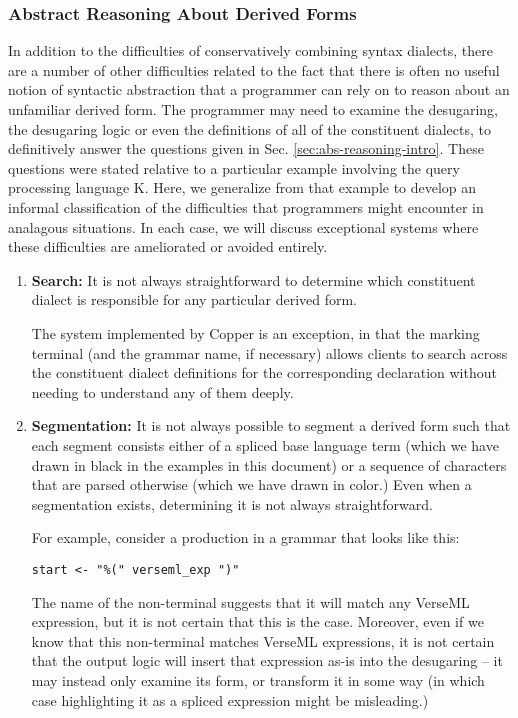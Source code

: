 {\subsubsection{Abstract Reasoning About Derived Forms}
In addition to the difficulties of conservatively combining syntax dialects, there are a  number of other difficulties related to the fact that there is often no useful notion of syntactic abstraction that a programmer can rely on to reason about an unfamiliar derived form. The programmer may need to examine the desugaring, the desugaring logic or even the definitions of all of the constituent dialects, to definitively answer the questions given in Sec. \ref{sec:abs-reasoning-intro}. These questions were stated relative to a particular example involving the query processing language K.  
Here, we generalize from that example to develop an informal classification of the difficulties that programmers might encounter in analagous situations. In each case, we will discuss exceptional systems where these difficulties are ameliorated or avoided entirely.%

\begin{enumerate}
\item \textbf{Search:} It is not always straightforward to determine which constituent dialect is responsible for any particular derived form.

The system implemented by Copper \cite{conf/pldi/SchwerdfegerW09} is an exception, in that the marking terminal (and the grammar name, if necessary) allows clients to search across the constituent dialect definitions for the corresponding declaration without needing to understand any of them deeply.
\item \textbf{Segmentation:} It is not always possible to segment a derived form such that each segment consists either of a spliced base language term (which we have drawn in black in the examples in this document) or a sequence of characters that are parsed otherwise (which we have drawn in color.) Even when a segmentation exists, determining it is not always straightforward.

For example, consider a production in a grammar that looks like this: 
\begin{lstlisting}[numbers=none]
start <- "%(" verseml_exp ")"
\end{lstlisting}

The name of the non-terminal  suggests that it will match any VerseML expression, but it is not certain that this is the case. Moreover, even if we know that this non-terminal matches VerseML expressions, it is not certain that the output logic will insert that expression as-is into the desugaring -- it may instead only examine its form, or transform it in some way (in which case highlighting it as a spliced expression might be misleading.)


\end{enumerate}}
